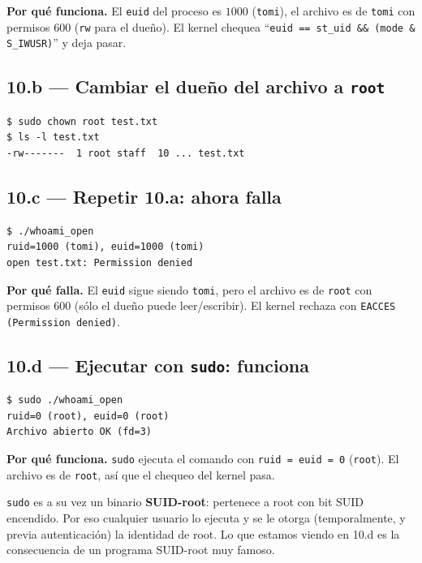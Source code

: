 \documentclass[11pt,a4paper]{article}
\begin{document}
\textbf{Por qué funciona.} El \texttt{euid} del proceso es $1000$
(\texttt{tomi}), el archivo es de \texttt{tomi} con permisos $600$
(\texttt{rw} para el dueño). El kernel chequea
``\texttt{euid == st\_uid \&\& (mode \& S\_IWUSR)}'' y deja pasar.

\subsection*{10.b --- Cambiar el dueño del archivo a \texttt{root}}

\begin{lstlisting}[style=shellstyle]
$ sudo chown root test.txt
$ ls -l test.txt
-rw-------  1 root staff  10 ... test.txt
\end{lstlisting}

\subsection*{10.c --- Repetir 10.a: ahora falla}

\begin{lstlisting}[style=shellstyle]
$ ./whoami_open
ruid=1000 (tomi), euid=1000 (tomi)
open test.txt: Permission denied
\end{lstlisting}

\textbf{Por qué falla.} El \texttt{euid} sigue siendo \texttt{tomi},
pero el archivo es de \texttt{root} con permisos $600$ (sólo el dueño
puede leer/escribir). El kernel rechaza con
\texttt{EACCES (Permission denied)}.

\subsection*{10.d --- Ejecutar con \texttt{sudo}: funciona}

\begin{lstlisting}[style=shellstyle]
$ sudo ./whoami_open
ruid=0 (root), euid=0 (root)
Archivo abierto OK (fd=3)
\end{lstlisting}

\textbf{Por qué funciona.} \texttt{sudo} ejecuta el comando con
\texttt{ruid = euid = 0} (\texttt{root}). El archivo es de
\texttt{root}, así que el chequeo del kernel pasa.

\begin{idea}
\texttt{sudo} es a su vez un binario \textbf{SUID-root}: pertenece a
root con bit SUID encendido. Por eso cualquier usuario lo ejecuta y se
le otorga (temporalmente, y previa autenticación) la identidad de
root. Lo que estamos viendo en 10.d es la consecuencia de un programa
SUID-root muy famoso.
\end{idea}
\end{document}
